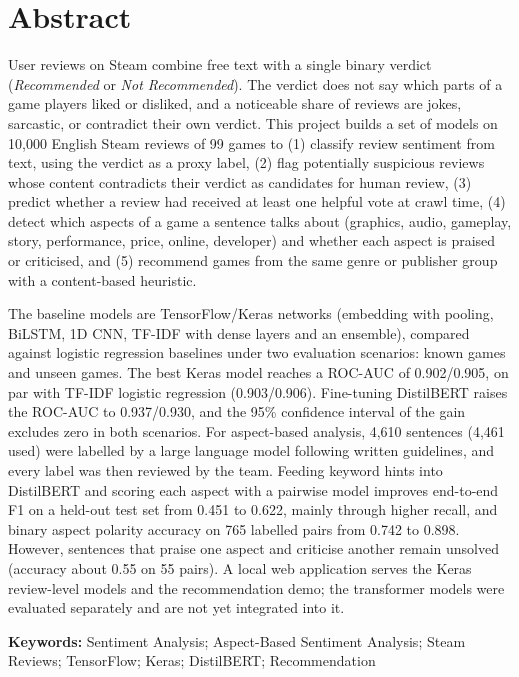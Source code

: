 \chapter*{Abstract}
\normalsize

User reviews on Steam combine free text with a single binary verdict (\textit{Recommended} or \textit{Not Recommended}). The verdict does not say which parts of a game players liked or disliked, and a noticeable share of reviews are jokes, sarcastic, or contradict their own verdict. This project builds a set of models on 10,000 English Steam reviews of 99 games to (1) classify review sentiment from text, using the verdict as a proxy label, (2) flag potentially suspicious reviews whose content contradicts their verdict as candidates for human review, (3) predict whether a review had received at least one helpful vote at crawl time, (4) detect which aspects of a game a sentence talks about (graphics, audio, gameplay, story, performance, price, online, developer) and whether each aspect is praised or criticised, and (5) recommend games from the same genre or publisher group with a content-based heuristic.

The baseline models are TensorFlow/Keras networks (embedding with pooling, BiLSTM, 1D CNN, TF-IDF with dense layers and an ensemble), compared against logistic regression baselines under two evaluation scenarios: known games and unseen games. The best Keras model reaches a ROC-AUC of 0.902/0.905, on par with TF-IDF logistic regression (0.903/0.906). Fine-tuning DistilBERT raises the ROC-AUC to 0.937/0.930, and the 95\% confidence interval of the gain excludes zero in both scenarios. For aspect-based analysis, 4,610 sentences (4,461 used) were labelled by a large language model following written guidelines, and every label was then reviewed by the team. Feeding keyword hints into DistilBERT and scoring each aspect with a pairwise model improves end-to-end F1 on a held-out test set from 0.451 to 0.622, mainly through higher recall, and binary aspect polarity accuracy on 765 labelled pairs from 0.742 to 0.898. However, sentences that praise one aspect and criticise another remain unsolved (accuracy about 0.55 on 55 pairs). A local web application serves the Keras review-level models and the recommendation demo; the transformer models were evaluated separately and are not yet integrated into it.

\vspace{0.5cm}
\noindent\textbf{Keywords:} Sentiment Analysis; Aspect-Based Sentiment Analysis; Steam Reviews; TensorFlow; Keras; DistilBERT; Recommendation
